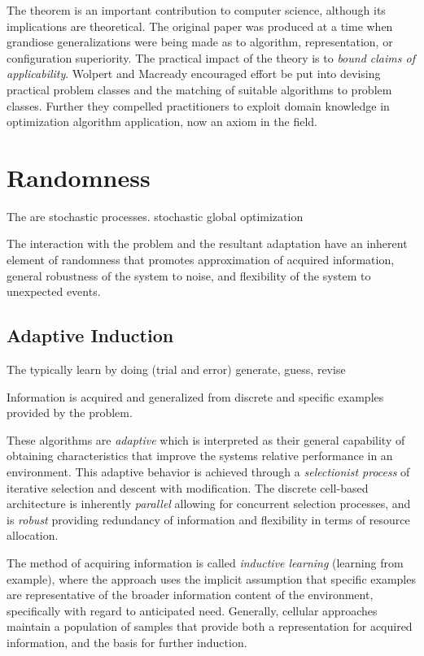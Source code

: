 \documentclass[a4paper, 11pt]{article}
\begin{document}
The theorem is an important contribution to computer science, although its implications are theoretical. The original paper was produced at a time when grandiose generalizations were being made as to algorithm, representation, or configuration superiority. The practical impact of the theory is to \emph{bound claims of applicability}. Wolpert and Macready encouraged effort be put into devising practical problem classes and the matching of suitable algorithms to problem classes. Further they compelled practitioners to exploit domain knowledge in optimization algorithm application, now an axiom in the field.


% 
% 
\section{Randomness}
The are stochastic processes.
stochastic global optimization

The interaction with the problem and the resultant adaptation have an inherent element of randomness that promotes approximation of acquired information, general robustness of the system to noise, and flexibility of the system to unexpected events. 


% 
% 
\subsection{Adaptive Induction}
The typically learn by doing (trial and error)
generate, guess, revise

Information is acquired and generalized from discrete and specific examples provided by the problem.

These algorithms are \emph{adaptive} which is interpreted as their general capability of obtaining characteristics that improve the systems relative performance in an environment. This adaptive behavior is achieved through a \emph{selectionist process} of iterative selection and descent with modification. The discrete cell-based architecture is inherently \emph{parallel} allowing for concurrent selection processes, and is \emph{robust} providing redundancy of information and flexibility in terms of resource allocation. 

The method of acquiring information is called \emph{inductive learning} (learning from example), where the approach uses the implicit assumption that specific examples are representative of the broader information content of the environment, specifically with regard to anticipated need. Generally, cellular approaches maintain a population of samples that provide both a representation for acquired information, and the basis for further induction.
\end{document}
